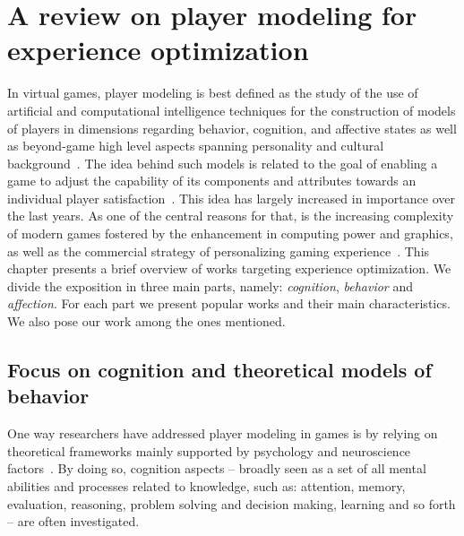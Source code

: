 \chapter{A review on player modeling for experience optimization}\label{expOptimization}
In virtual games, player modeling is best defined as the study of the use of artificial and computational intelligence techniques for the construction of models of players in dimensions regarding behavior, cognition, and affective states as well as beyond-game high level aspects spanning personality and cultural background~\citep{yannakakis_player_2013}. The idea behind such models is related to the goal of enabling a game to adjust the capability of its components and attributes towards an individual player satisfaction~\citep{herik_opponent_2005}. This idea has largely increased in importance over the last years. As one of the central reasons for that, is the increasing complexity of modern games fostered by the enhancement in computing power and graphics, as well as the commercial strategy of personalizing gaming experience~\citep{teng_customization_2010, herik_opponent_2005}. This chapter presents a brief overview of works targeting experience optimization. We divide the exposition in three main parts, namely: \textit{cognition}, \textit{behavior} and \textit{affection}. For each part we present popular works and their main characteristics. We also pose our work among the ones mentioned.

\section{Focus on cognition and theoretical models of behavior}
One way researchers have addressed player modeling in games is by relying on theoretical frameworks mainly supported by psychology and neuroscience factors~\citep{yannakakis_player_2013}. By doing so, cognition aspects -- broadly seen as a set of all mental abilities and processes related to knowledge, such as: attention, memory, evaluation, reasoning, problem solving and decision making, learning and so forth -- are often investigated. 

